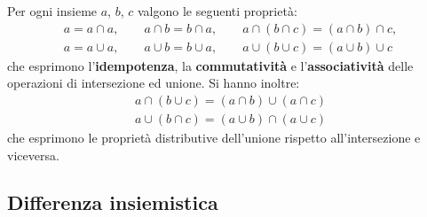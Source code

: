 \begin{propbox}
	Per ogni insieme $a$, $b$, $c$ valgono le seguenti proprietà:
	\begin{eqnarray}
		a=a \cap a, \qquad a\cap b=b\cap a, \qquad a\cap(b \cap c) = (a \cap b ) \cap c, \\
		a=a \cup a, \qquad a\cup b=b\cup a, \qquad a\cup(b \cup c) = (a \cup b ) \cup c
	\end{eqnarray}
	che esprimono l'\textbf{idempotenza}, la \textbf{commutatività} e l'\textbf{associatività} delle operazioni di intersezione ed unione. Si hanno inoltre:
	\begin{eqnarray} \label{prop:distributivaunioneintersezione}
		a \cap (b \cup c) = (a \cap b) \cup (a \cap c) \\
		a \cup (b \cap c) = (a \cup b) \cap (a \cup c)
	\end{eqnarray}
	che esprimono le proprietà distributive dell'unione rispetto all'intersezione e viceversa.
\end{propbox}

\subsection{Differenza insiemistica}

